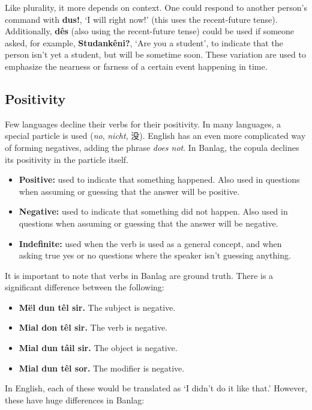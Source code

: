 \documentclass[12pt]{report}
\begin{document}
Like plurality, it more depends on context. One could respond to another person's command with \textbf{dus!}, `I will right now!' (this uses the recent-future tense). Additionally, \textbf{d\^es} (also using the recent-future tense) could be used if someone asked, for example, \textbf{Studank\^eni?}, `Are you a student', to indicate that the person isn't yet a student, but will be sometime soon. These variation are used to emphasize the nearness or farness of a certain event happening in time.

\subsection{Positivity}
Few languages decline their verbs for their positivity. In many languages, a special particle is used (\textit{no}, \textit{nicht}, 没). English has an even more complicated way of forming negatives, adding the phrase \textit{does not}. In Banlag, the copula declines its positivity in the particle itself.

\begin{itemize}
\item \textbf{Positive:} used to indicate that something happened. Also used in questions when assuming or guessing that the answer will be positive.
\item \textbf{Negative:} used to indicate that something did not happen. Also used in questions when assuming or guessing that the answer will be negative.
\item \textbf{Indefinite:} used when the verb is used as a general concept, and when asking true yes or no questions where the speaker isn't guessing anything.
\end{itemize}

It is important to note that verbs in Banlag are ground truth. There is a significant difference between the following:

\begin{itemize}
\item \textbf{M\"el dun t\^el sir.} The subject is negative.
\item \textbf{Mial don t\^el sir.} The verb is negative.
\item \textbf{Mial dun t\^ail sir.} The object is negative.
\item \textbf{Mial dun t\^el sor.} The modifier is negative.
\end{itemize}

In English, each of these would be translated as `I didn't do it like that.' However, these have huge differences in Banlag:
\end{document}

